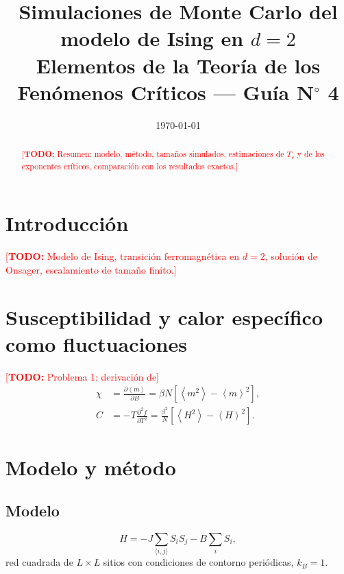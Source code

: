 \documentclass[a4paper,11pt]{article}
\title{Simulaciones de Monte Carlo del modelo de Ising en $d = 2$\\[0.3em]
\large Elementos de la Teoría de los Fenómenos Críticos --- Guía N$^\circ$ 4}
\author{\todo{Nombre}}
\date{\today}
\newcommand{\todo}[1]{\textcolor{red}{[\textbf{TODO:} #1]}}
\newcommand{\expval}[1]{\left\langle #1 \right\rangle}
\newcommand{\Tc}{T_c}
\begin{document}
\maketitle

\begin{abstract}
\todo{Resumen: modelo, método, tamaños simulados, estimaciones de $\Tc$ y de los exponentes críticos, comparación con los resultados exactos.}
\end{abstract}

\section{Introducción}
\todo{Modelo de Ising, transición ferromagnética en $d = 2$, solución de Onsager, escalamiento de tamaño finito.}

\section{Susceptibilidad y calor específico como fluctuaciones}
\label{sec:fluctuaciones}
\todo{Problema 1: derivación de}
\begin{align}
  \chi &= \frac{\partial \expval{m}}{\partial B} = \beta N \left[ \expval{m^2} - \expval{m}^2 \right], \\
  C &= -T \frac{\partial^2 f}{\partial T^2} = \frac{\beta^2}{N} \left[ \expval{H^2} - \expval{H}^2 \right].
\end{align}

\section{Modelo y método}
\label{sec:metodo}

\subsection{Modelo}
\begin{equation}
  H = -J \sum_{\langle i,j \rangle} S_i S_j - B \sum_i S_i ,
\end{equation}
red cuadrada de $L \times L$ sitios con condiciones de contorno periódicas, $k_B = 1$.
\end{document}
